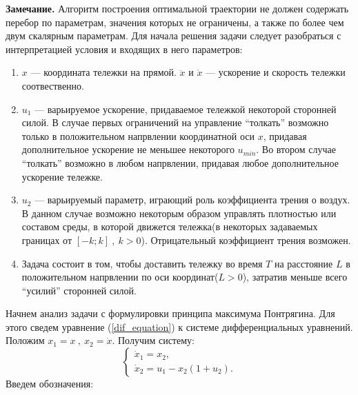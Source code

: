 \documentclass[10pt]{article}
\begin{document}
\noindent \textbf{Замечание.} Алгоритм построения оптимальной траектории не должен содержать перебор по параметрам, значения которых не ограничены, а также по более чем двум скалярным параметрам.
\newpage
{}
Для начала решения задачи следует разобраться с интерпретацией условия и входящих в него параметров:
\begin{enumerate}
	\item \( x \) --- координата тележки на прямой. \( \ddot{x} \) и \( \dot{x} \) --- ускорение и скорость тележки соотвественно.
	\item \( u_1 \) --- варьируемое ускорение, придаваемое тележкой некоторой сторонней силой. В случае первых ограничений на управление ``толкать'' возможно только в положительном напрвлении координатной оси \( x \), придавая дополнительное ускорение не меньшее некоторого \( u_{min} \). Во втором случае ``толкать'' возможно в любом напрвлении, придавая любое дополнительное ускорение тележке.
	\item \( u_2 \) --- варьируемый параметр, играющий роль коэффициента трения о воздух. В данном случае возможно некоторым образом управлять плотностью или составом среды, в которой движется тележка(в некоторых задаваемых границах от \( [-k; k] \ , \ k > 0 \)). Отрицательный коэффициент трения возможен.
	\item Задача состоит в том, чтобы доставить тележку во время \( T \) на расстояние \( L \) в положительном напрвлении по оси координат(\( L > 0\)), затратив меньше всего ``усилий'' сторонней силой.
\end{enumerate}
Начнем анализ задачи с формулировки принципа максимума Понтрягина. Для этого сведем уравнение (\ref{dif_equation}) к системе дифференциальных уравнений. Положим \( x_1 = x \ , \ x_2 = \dot{x} \). Получим систему:
\begin{equation} \label{dif_system}
	\begin{cases}
		\dot{x}_1 = x_2, 
		\\
		\dot{x}_2 = u_1 - x_2(1 + u_2).
	\end{cases}
\end{equation}
Введем обозначения:
\end{document}
